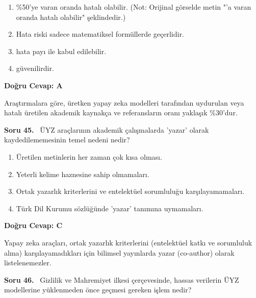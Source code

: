 \documentclass[11pt,a4paper,openany]{book}
\begin{document}
\begin{enumerate}[label=\Alph*), leftmargin=25pt, topsep=4pt, itemsep=2pt]
        \item \%50'ye varan oranda hatalı olabilir. (Not: Orijinal görselde metin "'a varan oranda hatalı olabilir" şeklindedir.)
        \item Hata riski sadece matematiksel formüllerde geçerlidir.
        \item hata payı ile kabul edilebilir.
        \item güvenilirdir.
\end{enumerate}

\vspace{4pt}
\begin{tcolorbox}[title=Cevap ve Açıklama, colback=gray!3!white, colframe=primarycolor!90!black, arc=2mm, fonttitle=\bfseries\sffamily, top=6pt, bottom=6pt]
    \textbf{Doğru Cevap: A}

    \vspace{2pt}
    Araştırmalara göre, üretken yapay zeka modelleri tarafından uydurulan veya hatalı üretilen akademik kaynakça ve referansların oranı yaklaşık \%30'dur.
\end{tcolorbox}
\vspace{10pt}
\needspace{5cm}
\vspace{8pt}
\noindent\textbf{\large\sffamily Soru 45.} \ ÜYZ araçlarının akademik çalışmalarda 'yazar' olarak kaydedilememesinin temel nedeni nedir?

\begin{enumerate}[label=\Alph*), leftmargin=25pt, topsep=4pt, itemsep=2pt]
        \item Üretilen metinlerin her zaman çok kısa olması.
        \item Yeterli kelime haznesine sahip olmamaları.
        \item Ortak yazarlık kriterlerini ve entelektüel sorumluluğu karşılayamamaları.
        \item Türk Dil Kurumu sözlüğünde 'yazar' tanımına uymamaları.
\end{enumerate}

\vspace{4pt}
\begin{tcolorbox}[title=Cevap ve Açıklama, colback=gray!3!white, colframe=primarycolor!90!black, arc=2mm, fonttitle=\bfseries\sffamily, top=6pt, bottom=6pt]
    \textbf{Doğru Cevap: C}

    \vspace{2pt}
    Yapay zeka araçları, ortak yazarlık kriterlerini (entelektüel katkı ve sorumluluk alma) karşılayamadıkları için bilimsel yayınlarda yazar (co-author) olarak listelenemezler.
\end{tcolorbox}
\vspace{10pt}
\needspace{5cm}
\vspace{8pt}
\noindent\textbf{\large\sffamily Soru 46.} \ Gizlilik ve Mahremiyet ilkesi çerçevesinde, hassas verilerin ÜYZ modellerine yüklenmeden önce geçmesi gereken işlem nedir?
\end{document}
